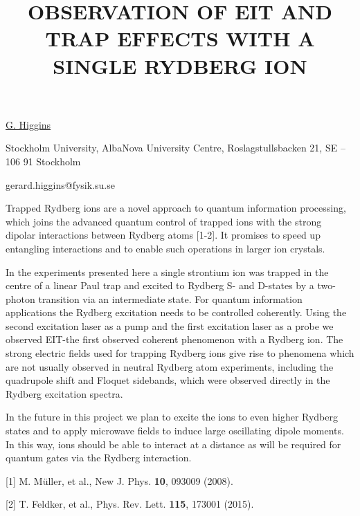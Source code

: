 \title{OBSERVATION OF EIT AND TRAP EFFECTS WITH A SINGLE RYDBERG ION}

\underline{G. Higgins} 

{\normalsize{\vspace{-4mm}
Stockholm University,
AlbaNova University Centre,
Roslagstullsbacken 21,
SE -- 106 91 Stockholm

\email gerard.higgins@fysik.su.se}}

Trapped Rydberg ions are a novel approach to quantum information processing, which joins the
advanced quantum control of trapped ions with the strong dipolar interactions between Rydberg atoms
[1-2]. It promises to speed up entangling interactions and to enable such operations in larger ion
crystals.

In the experiments presented here a single strontium ion was trapped in the centre of a linear Paul
trap and excited to Rydberg S- and D-states by a two-photon transition via an intermediate state.
For quantum information applications the Rydberg excitation needs to be controlled coherently.
Using the second excitation laser as a pump and the first excitation laser as a probe we observed
EIT-the first observed coherent phenomenon with a Rydberg ion. The strong electric fields used for
trapping Rydberg ions give rise to phenomena which are not usually observed in neutral Rydberg atom
experiments, including the quadrupole shift and Floquet sidebands, which were observed directly in
the Rydberg excitation spectra.

In the future in this project we plan to excite the ions to even higher Rydberg states and to apply
microwave fields to induce large oscillating dipole moments. In this way, ions should be able to
interact at a distance as will be required for quantum gates via the Rydberg interaction.

{\normalsize
[1] M. M\"{u}ller, et al., New J. Phys. \textbf{10}, 093009 (2008).
\vsp

[2] T. Feldker, et al., Phys. Rev. Lett. \textbf{115}, 173001 (2015).
}



\vspace{\baselineskip} 